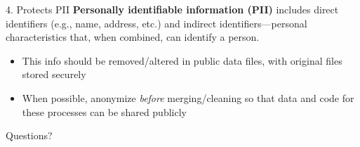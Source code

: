 \documentclass[12pt, compress]{beamer} %
\let\olditem\item %
\renewcommand{\item}{%
\olditem\vspace{\fill}}
\begin{document}
	\begin{frame}{4. Protects PII}
		 \textbf{Personally identifiable information (PII)} includes \textcolor{burntorange}{direct identifiers} (e.g., name, address, etc.) and \textcolor{burntorange}{indirect identifiers}---personal characteristics that, when combined, can identify a person.
			 
			 
		\begin{itemize}		
			\item This info should be removed/altered in public data files, with original files stored securely
			\item When possible, anonymize \textit{before} merging/cleaning so that data and code for these processes can be shared publicly
		\end{itemize} 
		\bigskip
			
	\end{frame}
 
\begin{frame}{}
	\bigskip
	\centering \large Questions?
\end{frame}
\end{document}
